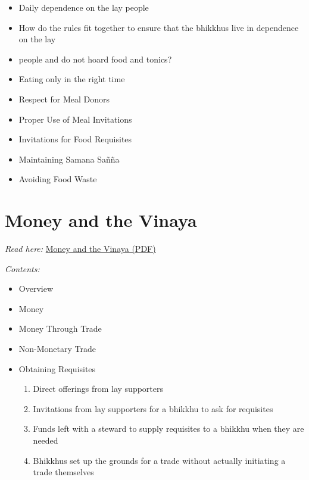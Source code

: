 \begin{itemize}
  \begin{itemize}
  \tightlist
  \item
    Daily dependence on the lay people
  \item
    How do the rules fit together to ensure that the bhikkhus live in
    dependence on the lay
  \item
    people and do not hoard food and tonics?
  \item
    Eating only in the right time
  \item
    Respect for Meal Donors
  \item
    Proper Use of Meal Invitations
  \item
    Invitations for Food Requisites
  \item
    Maintaining Samana Sañña
  \item
    Avoiding Food Waste
  \end{itemize}
\end{itemize}

\section{Money and the Vinaya}

\emph{Read here:}
\href{https://vinaya-class.github.io/includes/docs/money-and-the-vinaya.pdf}{Money
and the Vinaya (PDF)}

\emph{Contents:}

\begin{itemize}
\tightlist
\item
  Overview
\item
  Money
\item
  Money Through Trade
\item
  Non-Monetary Trade
\item
  Obtaining Requisites

  \begin{enumerate}
  \def\labelenumi{\arabic{enumi}.}
  \tightlist
  \item
    Direct offerings from lay supporters
  \item
    Invitations from lay supporters for a bhikkhu to ask for requisites
  \item
    Funds left with a steward to supply requisites to a bhikkhu when
    they are needed
  \item
    Bhikkhus set up the grounds for a trade without actually initiating
    a trade themselves
  \end{enumerate}
\end{itemize}

